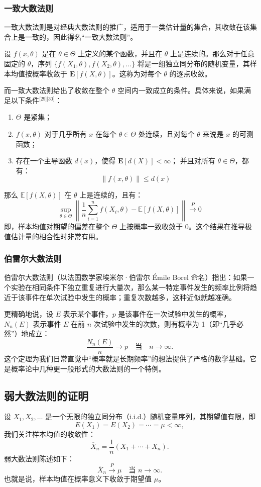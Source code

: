 \subsubsection{一致大数法则}
一致大数法则是对经典大数法则的推广，适用于一类估计量的集合，其收敛在该集合上是一致的，因此得名“一致大数法则”。

设 $f(x, \theta)$ 是在 $\theta \in \Theta$ 上定义的某个函数，并且在 $\theta$ 上是连续的。那么对于任意固定的 $\theta$，序列 $\{f(X_1, \theta), f(X_2, \theta), \dots\}$ 将是一组独立同分布的随机变量，其样本均值按概率收敛于 $\mathbf{E}[f(X, \theta)]$。这称为对每个 $\theta$ 的逐点收敛。

而一致大数法则给出了收敛在整个 $\theta$ 空间内一致成立的条件。具体来说，如果满足以下条件\(^\text{[29][30]}\)：
\begin{enumerate}
\item $\Theta$ 是紧集；
\item $f(x, \theta)$ 对于几乎所有 $x$ 在每个 $\theta \in \Theta$ 处连续，且对每个 $\theta$ 来说是 $x$ 的可测函数；
\item 存在一个主导函数 $d(x)$，使得 $\mathbf{E}[d(X)] < \infty$；
并且对所有 $\theta \in \Theta$，都有：
   $$
   \| f(x, \theta) \| \leq d(x)~
   $$
\end{enumerate}
那么 $\mathbb{E}[f(X, \theta)]$ 在 $\theta$ 上是连续的，且有：
$$
\sup_{\theta \in \Theta} \left\| \frac{1}{n} \sum_{i=1}^{n} f(X_i, \theta) - \mathbb{E}[f(X, \theta)] \right\| \xrightarrow{P} 0~
$$
即，样本均值对期望的偏差在整个 $\Theta$ 上按概率一致收敛于 0。这个结果在推导极值估计量的相合性时非常有用。
\subsubsection{伯雷尔大数法则}
伯雷尔大数法则（以法国数学家埃米尔·伯雷尔 Émile Borel 命名）指出：如果一个实验在相同条件下独立重复进行大量次，那么某一特定事件发生的频率比例将趋近于该事件在单次试验中发生的概率；重复次数越多，这种近似就越准确。

更精确地说，设 $E$ 表示某个事件，$p$ 是该事件在一次试验中发生的概率，$N_n(E)$ 表示事件 $E$ 在前 $n$ 次试验中发生的次数，则有概率为 1（即“几乎必然”）地成立：
$$
\frac{N_n(E)}{n} \to p \quad \text{当} \quad n \to \infty.~
$$
这个定理为我们日常直觉中“概率就是长期频率”的想法提供了严格的数学基础。它是概率论中几种更一般形式的大数法则的一个特例。
\subsection{弱大数法则的证明}
设 $X_1, X_2, \ldots$ 是一个无限的独立同分布（i.i.d.）随机变量序列，其期望值有限，即
$$
E(X_1) = E(X_2) = \cdots = \mu < \infty,~
$$
我们关注样本均值的收敛性：
$$
\overline{X}_n = \frac{1}{n}(X_1 + \cdots + X_n).~
$$
弱大数法则陈述如下：
$$
\overline{X}_n \overset{P}{\longrightarrow} \mu \quad \text{当 } n \to \infty.~
$$
也就是说，样本均值在概率意义下收敛于期望值 $\mu$。
